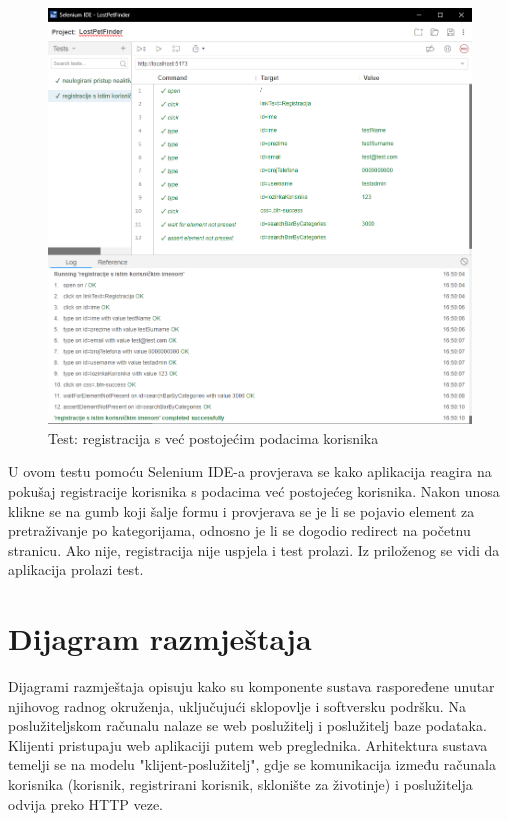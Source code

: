 			\begin{figure}[!htb]
				\centering
				\includegraphics[width=\textwidth]{slike/selenium_test_2.png}
				\caption{Test: registracija s već postojećim podacima korisnika}
			\end{figure}
			
			U ovom testu pomoću Selenium IDE-a provjerava se kako aplikacija reagira na pokušaj registracije korisnika s podacima već postojećeg korisnika. Nakon unosa klikne se na gumb koji šalje formu i provjerava se je li se pojavio element za pretraživanje po kategorijama, odnosno je li se dogodio redirect na početnu stranicu. Ako nije, registracija nije uspjela i test prolazi. Iz priloženog se vidi da aplikacija prolazi test. 
			
			\eject
		
		
		\section{Dijagram razmještaja}
			
                \noindent Dijagrami razmještaja opisuju kako su komponente sustava raspoređene unutar njihovog radnog okruženja, uključujući sklopovlje i softversku podršku. Na poslužiteljskom računalu nalaze se web poslužitelj i poslužitelj baze podataka. Klijenti pristupaju web aplikaciji putem web preglednika. Arhitektura sustava temelji se na modelu "klijent-poslužitelj", gdje se komunikacija između računala korisnika (korisnik, registrirani korisnik, sklonište za životinje) i poslužitelja odvija preko HTTP veze.

